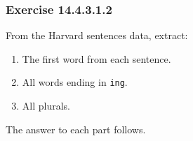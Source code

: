 \documentclass[]{book}
\providecommand{\tightlist}{%
  \setlength{\itemsep}{0pt}\setlength{\parskip}{0pt}}
\theoremstyle{plain}
\theoremstyle{remark}
\begin{document}
\hypertarget{exercise-14.4.3.1.2}{%
\subsubsection*{\texorpdfstring{Exercise {14.4.3.1.2}}{Exercise 14.4.3.1.2}}\label{exercise-14.4.3.1.2}}

From the Harvard sentences data, extract:

\begin{enumerate}
\def\labelenumi{\arabic{enumi}.}
\tightlist
\item
  The first word from each sentence.
\item
  All words ending in \texttt{ing}.
\item
  All plurals.
\end{enumerate}

The answer to each part follows.
\end{document}

